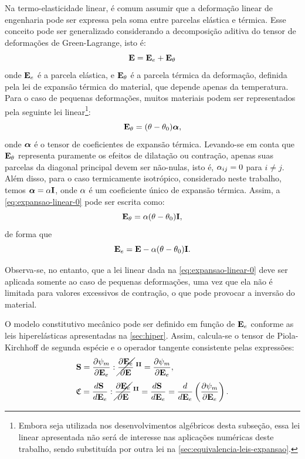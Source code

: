 \documentclass[Tese.tex]{subfiles}
\begin{document}
Na termo-elasticidade linear, é comum assumir que a deformação linear de engenharia pode ser expressa pela soma entre parcelas elástica e térmica. Esse conceito pode ser generalizado considerando a decomposição aditiva do tensor de deformações de Green-Lagrange, isto é:
\begin{equation}\label{eq:dec-aditiva}
\mathbf{E} = \mathbf{E}_e + \mathbf{E}_{\theta}
\end{equation}
onde $\mathbf{E}_e$ é a parcela elástica, e $\mathbf{E}_{\theta}$ é a parcela térmica da deformação, definida pela lei de expansão térmica do material, que depende apenas da temperatura. Para o caso de pequenas deformações, muitos materiais podem ser representados pela seguinte lei linear\footnote{Embora seja utilizada nos desenvolvimentos algébricos desta subseção, essa lei linear apresentada não será de interesse nas aplicações numéricas deste trabalho, sendo substituída por outra lei na \autoref{sec:equivalencia-leis-expansao}.}:
\begin{equation}\label{eq:expansao-linear-0}
\mathbf{E}_{\theta} = (\theta-\theta_0)\boldsymbol{\alpha},
\end{equation}
onde $\boldsymbol{\alpha}$ é o tensor de coeficientes de expansão térmica. Levando-se em conta que $\mathbf{E}_{\theta}$ representa puramente os efeitos de dilatação ou contração, apenas suas parcelas da diagonal principal devem ser não-nulas, isto é, $\alpha_{ij}=0$ para $i \ne j$. Além disso, para o caso termicamente isotrópico, considerado neste trabalho, temos $\boldsymbol{\alpha} = \alpha\mathbf{I}$, onde $\alpha$ é um coeficiente único de expansão térmica. Assim, a \cref{eq:expansao-linear-0} pode ser escrita como:
\begin{equation}\label{eq:expansao-linear}
\mathbf{E}_{\theta} = \alpha(\theta-\theta_0)\mathbf{I},
\end{equation}
de forma que
\begin{equation}\label{eq:Ee-expansao-linear}
\mathbf{E}_e = \mathbf{E} - \alpha(\theta-\theta_0)\mathbf{I}.
\end{equation}

Observa-se, no entanto, que a lei linear dada na \cref{eq:expansao-linear-0} deve ser aplicada somente ao caso de pequenas deformações, uma vez que ela não é limitada para valores excessivos de contração, o que pode provocar a inversão do material.

O modelo constitutivo mecânico pode ser definido em função de $\mathbf{E}_e$ conforme as leis hiperelásticas apresentadas na \autoref{sec:hiper}. Assim, calcula-se o tensor de Piola-Kirchhoff de segunda espécie e o operador tangente consistente pelas expressões:
\begin{align}
&\mathbf{S} = \dfrac{\partial \psi_m}{\partial \mathbf{E}_e}:\cancel{\dfrac{\partial \mathbf{E}_e}{\partial \mathbf{E}}}^{\;\mathbf{II}} = \dfrac{\partial \psi_m}{\partial \mathbf{E}_e}, \\[0.1cm]
&\mathfrak{C} = \dfrac{d \mathbf{S}_{\;}}{d \mathbf{E}_e}:\cancel{\dfrac{\partial \mathbf{E}_e}{\partial \mathbf{E}}}^{\;\mathbf{II}} = \dfrac{d \mathbf{S}_{\;}}{d \mathbf{E}_e} = \dfrac{d}{d \mathbf{E}_e}\left(\dfrac{\partial \psi_m}{\partial \mathbf{E}_e}\right).
\end{align}
\end{document}
